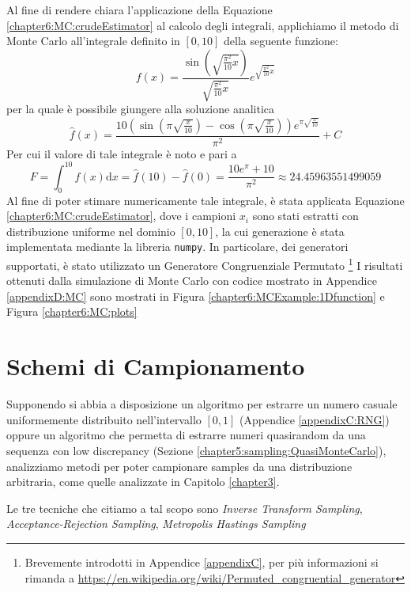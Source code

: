 Al fine di rendere chiara l'applicazione della Equazione \ref{chapter6:MC:crudeEstimator} al calcolo degli integrali, applichiamo il metodo di 
Monte Carlo all'integrale definito in $[0,10]$ della seguente funzione:
\begin{equation}\label{chapter6:MCExample:function}
	f(x)=\frac{\sin\left(\sqrt{\frac{\pi^{2}}{10}x}\right)}{\sqrt{\frac{\pi^{2}}{10}x}}e^{\sqrt{\frac{\pi^{2}}{10}x}}
\end{equation}
per la quale \`e possibile giungere alla soluzione analitica
\begin{equation}
	\hat{f}(x)=
		\frac{10\left(\sin\left(\pi\sqrt{\frac{x}{10}}\right)−\cos\left(\pi\sqrt{\frac{x}{10}}\right)\right)e^{\pi\sqrt{\frac{x}{10}}}}{\pi^2} + C
\end{equation}
Per cui il valore di tale integrale \`e noto e pari a 
\begin{equation}
	F = \int_0^{10}f(x)\mathrm{d}x = \hat{f}(10) - \hat{f}(0) = \frac{10e^\pi+10}{\pi^2}\approx 24.45963551499059
\end{equation}
Al fine di poter stimare numericamente tale integrale, \`e stata applicata Equazione \ref{chapter6:MC:crudeEstimator}, dove i campioni $x_i$ sono stati
estratti con distribuzione uniforme nel dominio $[0,10]$, la cui generazione \`e stata implementata mediante la libreria \texttt{numpy}. In particolare,
dei generatori supportati, \`e stato utilizzato un Generatore Congruenziale Permutato
\footnote{Brevemente introdotti in Appendice \ref{appendixC}, per pi\`u informazioni si rimanda a 
\href{https://en.wikipedia.org/wiki/Permuted\_congruential\_generator}{https://en.wikipedia.org/wiki/Permuted\_congruential\_generator}}
I risultati ottenuti dalla simulazione di Monte Carlo con codice mostrato in Appendice \ref{appendixD:MC} sono mostrati in Figura 
\ref{chapter6:MCExample:1Dfunction} e Figura \ref{chapter6:MC:plots}
\section{Schemi di Campionamento}
Supponendo si abbia a disposizione un algoritmo per estrarre un numero casuale uniformemente distribuito nell'intervallo $[0,1]$ 
(Appendice \ref{appendixC:RNG}) oppure un algoritmo che permetta di estrarre numeri quasirandom da una sequenza con low discrepancy 
(Sezione \ref{chapter5:sampling:QuasiMonteCarlo}),
analizziamo metodi per poter campionare samples da una distribuzione arbitraria, come quelle analizzate in Capitolo \ref{chapter3}.\par
Le tre tecniche che citiamo a tal scopo sono \textit{Inverse Transform Sampling}, \textit{Acceptance-Rejection Sampling}, 
\textit{Metropolis Hastings Sampling}
